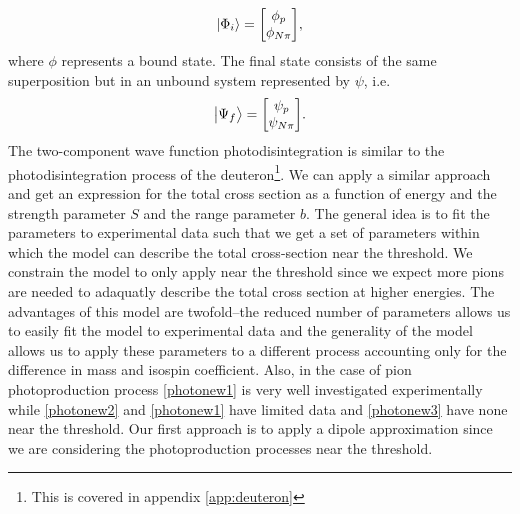 \begin{equation} \label{phii}
	\ket{\Phi_i} = \mqty[\phi_p \\ \phi_{N\pi}],
\end{equation}
where $\phi$ represents a bound state. The final state consists of the same superposition but in an unbound system represented by $\psi$, i.e.
\begin{equation} \label{psif}
	\ket{\Psi_f} = \mqty[\psi_p \\ \psi_{N\pi}].
\end{equation}
The two-component wave function photodisintegration is similar to the photodisintegration process of the deuteron\footnote{This is covered in appendix \ref{app:deuteron}}. We can apply a similar approach and get an expression for the total cross section as a function of energy and the strength parameter $S$ and the range parameter $b$. The general idea is to fit the parameters to experimental data such that we get a set of parameters within which the model can describe the total cross-section near the threshold. We constrain the model to only apply near the threshold since we expect more pions are needed to adaquatly describe the total cross section at higher energies.
The advantages of this model are twofold--the reduced number of parameters allows us to easily fit the model to experimental data and the generality of the model allows us to apply these parameters to a different process accounting only for the difference in mass and isospin coefficient. Also, in the case of pion photoproduction process \eqref{photonew1} is very well investigated experimentally while \eqref{photonew2} and \eqref{photonew1} have limited data and \eqref{photonew3} have none near the threshold. Our first approach is to apply a dipole approximation since we are considering the photoproduction processes near the threshold. 
